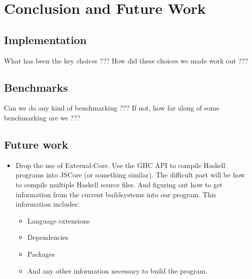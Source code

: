 
\chapter{Conclusion and Future Work}
\label{chap:conc}

\section{Implementation}

What has been the key choices ??? How did these choices we made work out ???

\section{Benchmarks}

Can we do any kind of benchmarking ??? If not, how far along of some 
benchmarking are we ???

\section{Future work}

\begin{itemize}

\item Drop the use of External-Core. Use the GHC API to compile Haskell programs
into JSCore (or something similar). The difficult part will be how to compile
multiple Haskell source files. And figuring out how to get information from the
current buildsystems into our program. This information includes:

\begin{itemize}

\item Language extensions
\item Dependencies
\item Packages
\item And any other information necessary to build the program.

\end{itemize}

\end{itemize}



